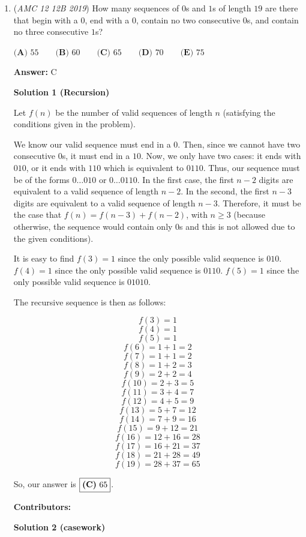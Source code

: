 \begin{enumerate}
 


 


	\item (\textit{AMC 12 12B 2019}) How many sequences of $0$s and $1$s of length $19$ are there that begin with a $0$, end with a $0$, contain no two consecutive $0$s, and contain no three consecutive $1$s?


 $\textbf{(A) }55\qquad\textbf{(B) }60\qquad\textbf{(C) }65\qquad\textbf{(D) }70\qquad\textbf{(E) }75$

 \textbf{Answer: }C



\textbf{Solution 1 (Recursion)}

Let $f(n)$ be the number of valid sequences of length $n$ (satisfying the conditions given in the problem). 

 We know our valid sequence must end in a $0$. Then, since we cannot have two consecutive $0$s, it must end in a $10$. Now, we only have two cases: it ends with $010$, or it ends with $110$ which is equivalent to $0110$. Thus, our sequence must be of the forms $0\ldots010$ or $0\ldots0110$. In the first case, the first $n-2$ digits are equivalent to a valid sequence of length $n-2$. In the second, the first $n-3$ digits are equivalent to a valid sequence of length $n-3$. Therefore, it must be the case that $f(n) = f(n-3) + f(n-2)$, with $n \ge 3$ (because otherwise, the sequence would contain only 0s and this is not allowed due to the given conditions). 

 It is easy to find $f(3) = 1$ since the only possible valid sequence is $010$. $f(4)=1$ since the only possible valid sequence is $0110$. $f(5)=1$ since the only possible valid sequence is $01010$. 

 The recursive sequence is then as follows:

 
 \[f(3)=1\]
 \[f(4)=1\]
 \[f(5) = 1\]
 \[f(6) = 1 + 1 = 2\] 
 \[f(7) = 1 + 1 = 2\]
 \[f(8) = 1 + 2 = 3\] 
 \[f(9) = 2 + 2 = 4\]
 \[f(10) = 2 + 3 = 5\]
 \[f(11) = 3 + 4 = 7\] 
 \[f(12) = 4 + 5 = 9\] 
 \[f(13) = 5 + 7 = 12\]
 \[f(14) = 7 + 9 = 16\] 
 \[f(15) = 9 + 12 = 21\]
 \[f(16) = 12 + 16 = 28\]
 \[f(17) = 16 + 21 = 37\] 
 \[f(18) = 21 + 28 = 49\]
 \[f(19) = 28 + 37 = 65\]

 So, our answer is $\boxed{\text{\textbf{(C)}  } 65}$.

 
\textbf{Contributors:}

 



\textbf{Solution 2 (casework)}


\end{enumerate}
